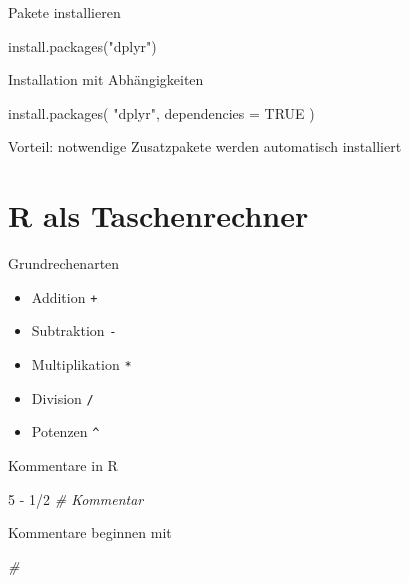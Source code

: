 \documentclass[
  10pt,
  ignorenonframetext,
  aspectratio=169,
]{beamer}
\newenvironment{Shaded}{}{}
\newcommand{\AttributeTok}[1]{\textcolor[rgb]{0.49,0.56,0.16}{#1}}
\newcommand{\CommentTok}[1]{\textcolor[rgb]{0.38,0.63,0.69}{\textit{#1}}}
\newcommand{\ConstantTok}[1]{\textcolor[rgb]{0.53,0.00,0.00}{#1}}
\newcommand{\DecValTok}[1]{\textcolor[rgb]{0.25,0.63,0.44}{#1}}
\newcommand{\FunctionTok}[1]{\textcolor[rgb]{0.02,0.16,0.49}{#1}}
\newcommand{\NormalTok}[1]{#1}
\newcommand{\SpecialCharTok}[1]{\textcolor[rgb]{0.25,0.44,0.63}{#1}}
\newcommand{\StringTok}[1]{\textcolor[rgb]{0.25,0.44,0.63}{#1}}
\providecommand{\tightlist}{%
  \setlength{\itemsep}{0pt}\setlength{\parskip}{0pt}}
\begin{document}
\begin{frame}[fragile]{Pakete installieren}
\label{pakete-installieren}
\begin{Shaded}
\begin{Highlighting}[]
\FunctionTok{install.packages}\NormalTok{(}\StringTok{"dplyr"}\NormalTok{)}
\end{Highlighting}
\end{Shaded}
\end{frame}

\begin{frame}[fragile]{Installation mit Abhängigkeiten}
\label{installation-mit-abhuxe4ngigkeiten}
\begin{Shaded}
\begin{Highlighting}[]
\FunctionTok{install.packages}\NormalTok{(}
  \StringTok{"dplyr"}\NormalTok{,}
  \AttributeTok{dependencies =} \ConstantTok{TRUE}
\NormalTok{)}
\end{Highlighting}
\end{Shaded}

Vorteil: notwendige Zusatzpakete werden automatisch installiert
\end{frame}

\section{R als Taschenrechner}\label{r-als-taschenrechner}

\begin{frame}[fragile]{Grundrechenarten}
\label{grundrechenarten}
\begin{itemize}
\tightlist
\item
  Addition \texttt{+}
\item
  Subtraktion \texttt{-}
\item
  Multiplikation \texttt{*}
\item
  Division \texttt{/}
\item
  Potenzen \texttt{\^{}}
\end{itemize}
\end{frame}

\begin{frame}[fragile]{Kommentare in R}
\label{kommentare-in-r}
\begin{Shaded}
\begin{Highlighting}[]
\DecValTok{5} \SpecialCharTok{{-}} \DecValTok{1}\SpecialCharTok{/}\DecValTok{2}  \CommentTok{\# Kommentar}
\end{Highlighting}
\end{Shaded}

Kommentare beginnen mit

\begin{Shaded}
\begin{Highlighting}[]
\CommentTok{\#}
\end{Highlighting}
\end{Shaded}
\end{frame}
\end{document}
